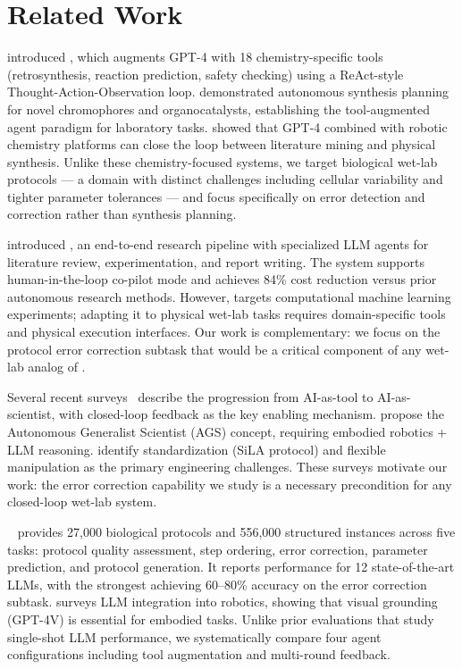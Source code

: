 \section{Related Work}
\label{sec:related}

\citet{bran2023chemcrow} introduced \chemcrow, which augments GPT-4 with 18 chemistry-specific tools (retrosynthesis, reaction prediction, safety checking) using a ReAct-style~\cite{yao2023react} Thought-Action-Observation loop.
\chemcrow demonstrated autonomous synthesis planning for novel chromophores and organocatalysts, establishing the tool-augmented agent paradigm for laboratory tasks.
\citet{qin2023gptlab} showed that GPT-4 combined with robotic chemistry platforms can close the loop between literature mining and physical synthesis.
Unlike these chemistry-focused systems, we target biological wet-lab protocols --- a domain with distinct challenges including cellular variability and tighter parameter tolerances --- and focus specifically on error detection and correction rather than synthesis planning.

\citet{schmidgall2025agentlab} introduced \agentlab, an end-to-end research pipeline with specialized LLM agents for literature review, experimentation, and report writing.
The system supports human-in-the-loop co-pilot mode and achieves 84\% cost reduction versus prior autonomous research methods.
However, \agentlab targets computational machine learning experiments; adapting it to physical wet-lab tasks requires domain-specific tools and physical execution interfaces.
Our work is complementary: we focus on the protocol error correction subtask that would be a critical component of any wet-lab analog of \agentlab.

Several recent surveys~\cite{gridach2025agentic,ren2025scientific,zheng2025automation,zhou2025autonomous,zhang2025scaling} describe the progression from AI-as-tool to AI-as-scientist, with closed-loop feedback as the key enabling mechanism.
\citet{zhang2025scaling} propose the Autonomous Generalist Scientist (AGS) concept, requiring embodied robotics + LLM reasoning.
\citet{cooper2025accelerating} identify standardization (SiLA protocol) and flexible manipulation as the primary engineering challenges.
These surveys motivate our work: the error correction capability we study is a necessary precondition for any closed-loop wet-lab system.

\bioprobench~\cite{bioprobench2025} provides 27,000 biological protocols and 556,000 structured instances across five tasks: protocol quality assessment, step ordering, error correction, parameter prediction, and protocol generation.
It reports performance for 12 state-of-the-art LLMs, with the strongest achieving 60--80\% accuracy on the error correction subtask.
\citet{wang2024robotics} surveys LLM integration into robotics, showing that visual grounding (\eg GPT-4V) is essential for embodied tasks.
Unlike prior \bioprobench evaluations that study single-shot LLM performance, we systematically compare four agent configurations including tool augmentation and multi-round feedback.
